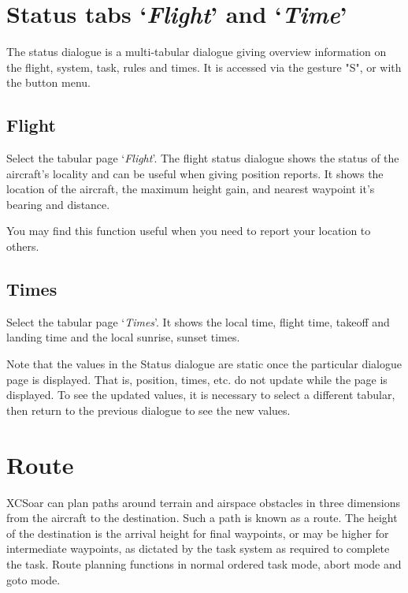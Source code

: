 \section{Status tabs `{\it Flight}' and `{\it Time}'}\label{sec:flight-status}

The status dialogue is a multi-tabular dialogue giving overview information on the 
flight, system, task, rules and times.
It is accessed via the gesture "S", or with the button menu. 
\begin{quote}
\blink{}
\end{quote}

\subsection*{Flight}
Select the tabular page `{\it Flight}'. 
The flight status dialogue shows the status of the aircraft's locality and can 
be useful when giving position reports. It shows the location of the aircraft, the
maximum height gain, and nearest waypoint it's bearing and distance.

You may find this function useful when you need to report your
location to others.

\subsection*{Times}\label{sec:time-status}
Select the tabular page `{\it Times}'. 
It shows the local time, flight time, takeoff and landing time and
the local sunrise, sunset times.

Note that the values in the Status dialogue 
are static once the particular dialogue page is displayed. 
That is, position, times, etc. do not update while the page is displayed. 
To see the updated values, it is necessary to select a different tabular, 
then return to the previous dialogue to see the new values.


\section{Route}\label{sec:route}

XCSoar can plan paths around terrain and airspace obstacles in three
dimensions from the aircraft to the destination.  Such a path is known
as a route.  The height of the destination is the arrival height for
final waypoints, or may be higher for intermediate waypoints, as
dictated by the task system as required to complete the task.  Route
planning functions in normal ordered task mode, abort mode and goto
mode.

